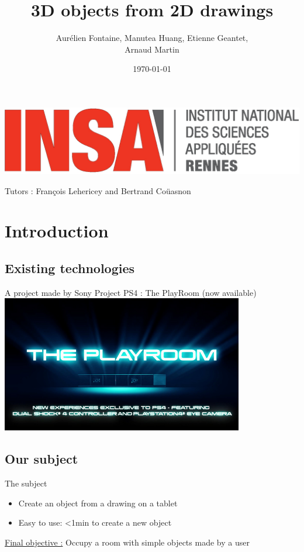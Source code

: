 \documentclass[a4paper,10pt]{beamer}
\title{3D objects from 2D drawings}
\author[Groupe 3INFO]{Aurélien Fontaine, Manutea Huang, Etienne Geantet,\\ Arnaud Martin}
\institute[INSA de Rennes]{Institut National des Sciences Appliquées de Rennes}
\date{\today}
\begin{document}
	\begin{frame}
		\begin{titlepage}
			\centerline{\includegraphics[scale=0.1]{images/logos/logoINSA.jpg}}
			\centerline{Tutors : François Lehericey and Bertrand Coüasnon}	
		\end{titlepage}
	\end{frame}
	
	
	
	\section{Introduction}
		\subsection{Existing technologies}
		
		\begin{frame}{A project made by Sony}
			Project PS4 : The PlayRoom (now available)
			\href{run:Video intro playroom.wmv}{\includegraphics[width=300pt]{images/The-Playroom.jpg}}
		\end{frame}
		
			
	\begin{frame}
		\tableofcontents
	\end{frame}
			
		\subsection{Our subject}
		
		\begin{frame}{The subject}
			\begin{itemize}
				\item Create an object from a drawing on a tablet
				\item Easy to use: <1min to create a new object
			\end{itemize}
			\underline{Final objective :} Occupy a room with simple objects made by a user
		\end{frame}
		
\end{document}
